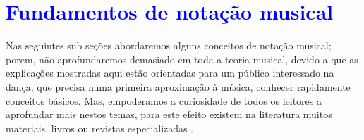 
\chapter{\textcolor{blue}{Fundamentos de notação musical}}
Nas seguintes sub seções abordaremos alguns conceitos de notação musical;
porem, não aprofundaremos demasiado em toda a teoria musical, 
devido a que as explicações mostradas aqui estão
orientadas para um público interessado na dança, que precisa numa primeira 
aproximação à música, conhecer rapidamente conceitos básicos. 
Mas, empoderamos a curiosidade de todos os leitores a aprofundar mais nestos temas, 
para este efeito existem na literatura muitos materiais, livros ou revistas especializadas 
\cite{medteoria}        %
\cite{cardoso1973curso} %
\cite{mascarenhascurso} %
\cite{grabner2001teoria}%
\cite{alves2004teoria}  %
\cite{apel1969harvard}  %
\cite{azevedocompor}    %
\cite{adolfo2002musica}.%










